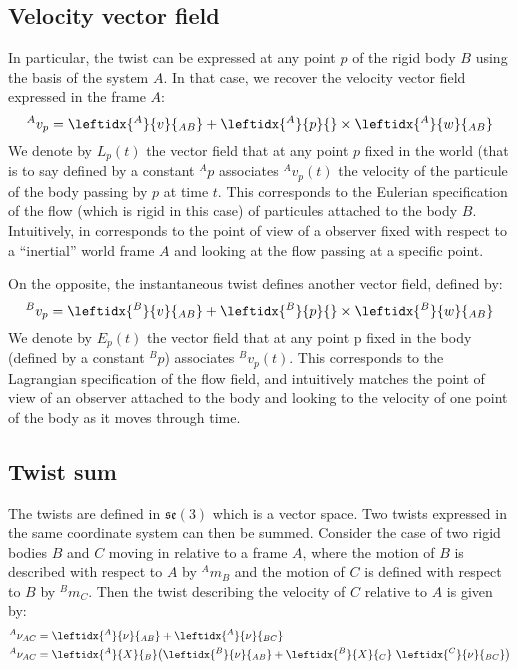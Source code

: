 \documentclass{book}
\begin{document}
\subsection{Velocity vector field}
In particular, the twist can be expressed at any point $p$ of the rigid body $B$ using the basis of the system $A$. In that case, we recover the velocity vector field expressed in the frame $A$:
$$ ^Av_p = \leftidx{^A}{v}{_{AB}} + \leftidx{^A}{p}{} \times \leftidx{^A}{w}{_{AB}} $$
We denote by $L_p(t)$ the vector field that at any point $p$ fixed in the world (that is to say defined by a constant $^Ap$ associates $^Av_p(t)$ the velocity of the particule of the body passing by $p$ at time $t$. This corresponds to the Eulerian specification of the flow (which is rigid in this case) of particules attached to the body $B$. Intuitively, in corresponds to the point of view of a observer fixed with respect to a ``inertial'' world frame $A$ and looking at the flow passing at a specific point.

On the opposite, the instantaneous twist defines another vector field, defined by:
$$ ^Bv_p = \leftidx{^B}{v}{_{AB}} + \leftidx{^B}{p}{} \times \leftidx{^B}{w}{_{AB}} $$
We denote by $E_p(t)$ the vector field that at any point p fixed in the body (\mie defined by a constant $^Bp$) associates $^Bv_p(t)$. This corresponds to the Lagrangian specification of the flow field, and intuitively matches the point of view of an observer attached to the body and looking to the velocity of one point of the body as it moves through time.

\subsection{Twist sum}

The twists are defined in $\mathfrak{se}(3)$ which is a vector space. Two twists expressed in the same coordinate system can then be summed. Consider the case of two rigid bodies $B$ and $C$ moving in relative to a frame $A$, where the motion of $B$ is described with respect to $A$ by $^Am_B$ and the motion of $C$ is defined with respect to $B$ by $^Bm_C$. Then the twist describing the velocity of $C$ relative to $A$ is given by:
\begin{align}
 ^A\nu_{AC} &= \leftidx{^A}{\nu}{_{AB}} + \leftidx{^A}{\nu}{_{BC}} \\
 ^A\nu_{AC} &= \leftidx{^A}{X}{_B} \big( \leftidx{^B}{\nu}{_{AB}} + \leftidx{^B}{X}{_C} \ \leftidx{^C}{\nu}{_{BC}}  \big) \end{align}
\end{document}
